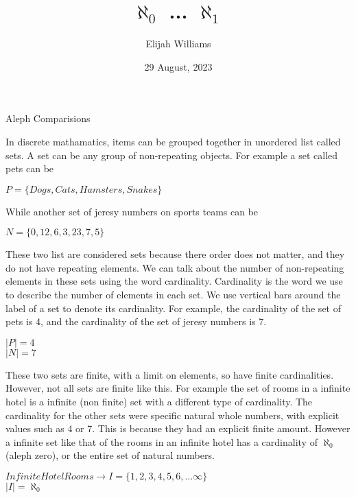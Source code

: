 \documentclass{article}
\title{$\aleph_0$   ...  $\aleph_1$}
\author{Elijah Williams}
\date{29 August, 2023}
\begin{document}
\pagestyle{fancy}
\maketitle
\newpage
\begin{large}
\begin{center}
  {\Huge Aleph Comparisions}
\end{center}





In discrete mathamatics, items can be grouped together in unordered list called sets.
A set can be any group of non-repeating objects.
For example a set called pets can be
\begin{center}
$ P = \{Dogs, Cats, Hamsters, Snakes\}$ 
\end{center}
While another set of jeresy numbers on sports teams can be
\begin{center}
$ N = \{0, 12, 6, 3, 23, 7, 5\}$

\end{center}
These two list are considered sets because there order does not matter, and they do not have repeating elements.
We can talk about the number of non-repeating elements in these sets using the word cardinality.
Cardinality is the word we use to describe the number of elements in each set.
We use vertical bars around the label of a set to denote its cardinality.
For example, the cardinality of the set of pets is 4, and the cardinality of the set of jeresy numbers is 7.
\begin{center}
  $ |P| = 4$
  \\
  $ |N| = 7$
  \\
\end{center}



     These two sets are finite, with a limit on elements, so have finite cardinalities.
However, not all sets are finite like this.
For example the set of rooms in a infinite hotel is a infinite (non finite) set with a different type of cardinality.
The cardinality for the other sets were specific natural whole numbers, with explicit values such as 4 or 7.
This is because they had an explicit finite amount.
However a infinite set like that of the rooms in an infinite hotel has a cardinality of $ \aleph_0 $ (aleph zero), or the entire set of natural numbers.
\begin{center}
  $ Infinite Hotel Rooms \rightarrow I = \{1, 2, 3, 4, 5, 6, ... \infty\}$
  \\
  $ |I| = \aleph_0 $
\end{center}



\end{large}
\end{document}
